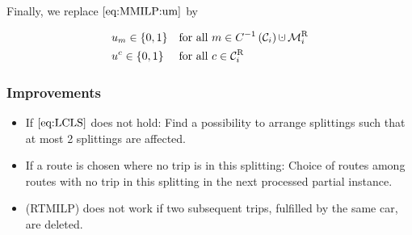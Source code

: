 Finally, we replace $\eqref{eq:MMILP:um}$ by

\begin{align}
	& u_m\in\{0,1\} && \text{for all } m\in C^{-1}\left(\mathcal{C}_i\right)\cupdot\MR_i \label{eq:RTMILP:um} \\
	& u^c \in\{0,1\} && \text{for all } c\in\CR_i \label{eq:RTMILP:uc}
\end{align}


\subsubsection{Improvements}

\begin{itemize}
	\item{If $\eqref{eq:LCLS}$ does not hold: Find a possibility to arrange splittings such that at most 2 splittings are affected.}
	\item{If a route is chosen where no trip is in this splitting: Choice of routes among routes with no trip in this splitting in the next processed partial instance.}
	\item{(RTMILP) does not work if two subsequent trips, fulfilled by the same car, are deleted.}
\end{itemize}
